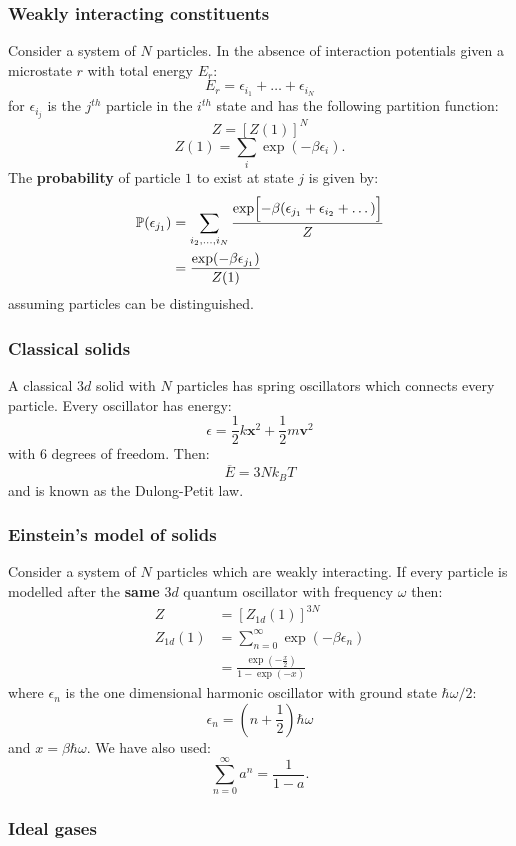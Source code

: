 \documentclass{article}
\newcommand{\vc}[1]{\boldsymbol{#1}}
\begin{document}
\begin{multicols*}{3}
\subsubsection*{Weakly interacting constituents}
Consider a system of $N$ particles.
In the absence of interaction potentials given a microstate
$r$ with total energy $E_r$:
$$E_r=\epsilon_{i_1}+\dots+\epsilon_{i_N}$$
for $\epsilon_{i_j}$ is the $j^{th}$ particle in the $i^{th}$ state
and has the following partition function:
$$Z=[Z(1)]^N$$
$$Z(1)=\sum_i\exp(-\beta\epsilon_i).$$
The \textbf{probability} of particle $1$ to exist at 
state $j$ is given by:
\begin{align*}
    \mathbb{P}(\epsilon_{j_1})
    &=\sum_{i_2,\dots,i_N}\frac{\exp\Bigl[-\beta
    (\epsilon_{j_1}+\epsilon_{i_2}+\dots)\Bigr]}{Z} \\
    &=\frac{\exp(-\beta\epsilon_{j_1})}{Z(1)}
\end{align*}
assuming particles can be distinguished.

\subsubsection*{Classical solids}
A classical $3d$ solid with $N$ particles has
spring oscillators which connects every particle.
Every oscillator has energy:
$$\epsilon=\frac{1}{2}k\vc{x}^2+\frac{1}{2}m\vc{v}^2$$
with $6$ degrees of freedom. Then:
$$\overline{E}=3Nk_B T$$
and is known as the Dulong-Petit law.

\subsubsection*{Einstein's model of solids}
Consider a system of $N$ particles which are weakly interacting.
If every particle is modelled after the \textbf{same}
$3d$ quantum oscillator with frequency $\omega$ then:
\begin{align*}
    Z &= [Z_{1d}(1)]^{3N} \\
    Z_{1d}(1) 
    &=\sum_{n=0}^{\infty}\exp(-\beta\epsilon_n) \\
    &=\frac{\exp(-\frac{x}{2})}{1-\exp(-x)}
\end{align*}
where $\epsilon_n$ is the one dimensional harmonic oscillator
with ground state $\hbar\omega/2$:
$$\epsilon_n=\left(n+\frac{1}{2}\right)\hbar\omega$$
and $x=\beta\hbar\omega$. We have also used:
$$\sum_{n=0}^{\infty}a^n=\frac{1}{1-a}.$$

\subsubsection*{Ideal gases}

\end{multicols*}
\end{document}
